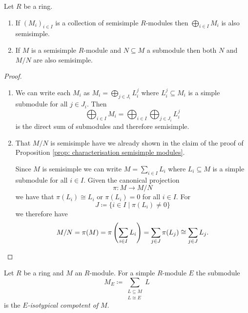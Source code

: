 \begin{lem}\label{lem: inherit semisimple}
  Let $R$ be a ring.
  \begin{enumerate}[label=\emph{\alph*)},leftmargin=*]
    \item
      If $(M_i)_{i \in I}$ is a collection of semisimple $R$-modules then $\bigoplus_{i \in I} M_i$ is also semisimple.
    \item
      If $M$ is a semisimple $R$-module and $N \subseteq M$ a submodule then both $N$ and $M/N$ are also semisimple.
  \end{enumerate}
\end{lem}
\begin{proof}
  \begin{enumerate}[label=\emph{\alph*)},leftmargin=*]
    \item
      We can write each $M_i$ as $M_i = \bigoplus_{j \in J_i} L^j_i$ where $L^j_i \subseteq M_i$ is a simple submodule for all $j \in J_i$.
      Then
      \[
          \bigoplus_{i \in I} M_i
        = \bigoplus_{i \in I} \bigoplus_{j \in J_i} L^j_i
      \]
      is the direct sum of submodules and therefore semisimple.
    \item
      That $M/N$ is semisimple have we already shown in the claim of the proof of Proposition \ref{prop: characterisation semisimple modules}.
      
      Since $M$ is semisimple we can write $M = \sum_{i \in I} L_i$ where $L_i \subseteq M$ is a simple submodule for all $i \in I$.
      Given the canonical projection
      \[
                \pi
        \colon  M
        \to     M / N
      \]
      we have that $\pi(L_i) \cong L_i$ or $\pi(L_i) = 0$ for all $i \in I$.
      For
      \[
                  J
        \coloneqq \{
                    i \in I
                  \mid
                    \pi(L_i) \neq 0
                  \}
      \]
      we therefore have
      \[
              M/N
        =     \pi(M)
        =     \pi\left( \sum_{i \in I} L_i \right)
        =     \sum_{j \in J} \pi(L_j)
        \cong \sum_{j \in J} L_j.
        \qedhere
      \]
  \end{enumerate}
\end{proof}


\begin{defi}
  Let $R$ be a ring and $M$ an $R$-module.
  For a simple $R$-module $E$ the submodule
  \[
              M_E
    \coloneqq \sum_{\substack{L \subseteq M \\ L \cong E}} L
  \]
  is the \emph{$E$-isotypical compotent of $M$}.
\end{defi}


